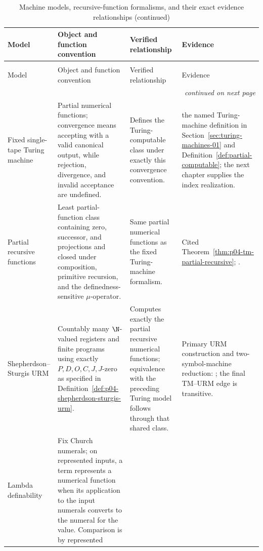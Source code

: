 \begin{landscape}
\begingroup\small\setlength{\tabcolsep}{3pt}
\begin{longtable}{@{}p{1.10in}p{2.25in}p{1.85in}p{1.84in}@{}}
\caption{Machine models, recursive-function formalisms, and their exact
evidence relationships.}
\label{tab:p04-machine-equivalences}\\
\toprule
Model & Object and function convention & Verified relationship & Evidence \\
\midrule
\endfirsthead
\caption[]{Machine models, recursive-function formalisms, and their exact
evidence relationships (continued)}\\
\toprule
Model & Object and function convention & Verified relationship & Evidence \\
\midrule
\endhead
\midrule\multicolumn{4}{r}{\emph{continued on next page}}\\
\endfoot
\endlastfoot
Fixed single-tape Turing machine & Partial numerical functions; convergence
means accepting with a valid canonical output, while rejection, divergence,
and invalid acceptance are undefined. & Defines the Turing-computable class
under exactly this convergence convention. &
the named Turing-machine definition in Section~\ref{sec:turing-machines-01}
and Definition~\ref{def:partial-computable}; the next chapter supplies the index
realization. \\
\addlinespace
Partial recursive functions & Least partial-function class containing zero,
successor, and projections and closed under composition, primitive recursion,
and the definedness-sensitive \(\mu\)-operator. & Same partial numerical
functions as the fixed Turing-machine formalism. & Cited
Theorem~\ref{thm:p04-tm-partial-recursive};
\cite{Kleene1936,Kleene1952,Turing1937Lambda}. \\
\addlinespace
Shepherdson--Sturgis URM & Countably many \(\N\)-valued registers and finite
programs using exactly \(P,D,O,C,J,J\)-zero as specified in
Definition~\ref{def:p04-shepherdson-sturgis-urm}. & Computes exactly the
partial recursive numerical functions; equivalence with the preceding Turing
model follows through that shared class. & Primary URM construction and
two-symbol-machine reduction: \cite{ShepherdsonSturgis1963}; the final
TM--URM edge is transitive. \\
\addlinespace
Lambda definability & Fix Church numerals; on represented inputs, a term
represents a numerical function when its application to the input numerals
converts to the numeral for the value.  Comparison is by represented

\end{longtable}
\end{landscape}
